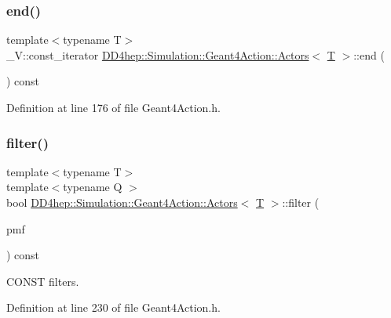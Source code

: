\subsubsection{\texorpdfstring{end()}{end()}\hspace{0.1cm}{\footnotesize\ttfamily [2/2]}}
{\footnotesize\ttfamily template$<$typename T$>$ \\
\+\_\+\+V\+::const\+\_\+iterator \hyperlink{class_d_d4hep_1_1_simulation_1_1_geant4_action_1_1_actors}{D\+D4hep\+::\+Simulation\+::\+Geant4\+Action\+::\+Actors}$<$ \hyperlink{class_t}{T} $>$\+::end (\begin{DoxyParamCaption}{ }\end{DoxyParamCaption}) const\hspace{0.3cm}{\ttfamily [inline]}}



Definition at line 176 of file Geant4\+Action.\+h.

\hypertarget{class_d_d4hep_1_1_simulation_1_1_geant4_action_1_1_actors_a33038ce776dcdbdc1629acf9e989b68b}{}\label{class_d_d4hep_1_1_simulation_1_1_geant4_action_1_1_actors_a33038ce776dcdbdc1629acf9e989b68b} 
\subsubsection{\texorpdfstring{filter()}{filter()}\hspace{0.1cm}{\footnotesize\ttfamily [1/3]}}
{\footnotesize\ttfamily template$<$typename T$>$ \\
template$<$typename Q $>$ \\
bool \hyperlink{class_d_d4hep_1_1_simulation_1_1_geant4_action_1_1_actors}{D\+D4hep\+::\+Simulation\+::\+Geant4\+Action\+::\+Actors}$<$ \hyperlink{class_t}{T} $>$\+::filter (\begin{DoxyParamCaption}\item[{bool(Q\+::$\ast$)() const}]{pmf }\end{DoxyParamCaption}) const\hspace{0.3cm}{\ttfamily [inline]}}



C\+O\+N\+ST filters. 



Definition at line 230 of file Geant4\+Action.\+h.

